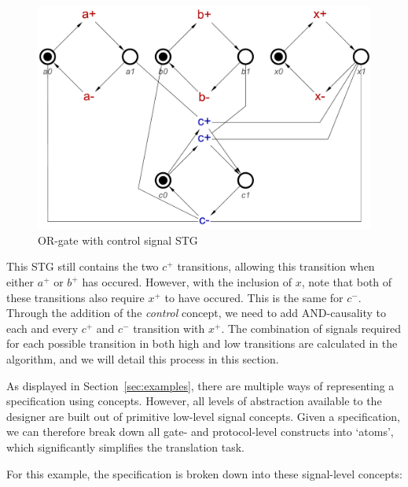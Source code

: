 \documentclass[british,conference,compsoc]{IEEEtran}
\begin{document}
\begin{figure}[h]
\begin{centering}
\includegraphics[scale=0.25]{Images/or-gate-ctrl-stg}
\par\end{centering}
\protect\caption{\label{fig:or-gate-ctrl} OR-gate with control signal STG}
\end{figure}

This STG still contains the two $c^{+}$ transitions, allowing this transition when either 
$a^{+}$ or $b^{+}$ has occured. However, with the inclusion of $x$, note that both
of these transitions also require $x^{+}$ to have occured. This is the same for $c^{-}$. 
Through the addition of the \emph{control} concept, we need to add AND-causality to
each and every $c^{+}$ and $c^{-}$ transition with $x^{+}$. The combination of signals
required for each possible transition in both high and low transitions are calculated in the
algorithm, and we will detail this process in this section.

As displayed in Section~\ref{sec:examples}, there are multiple ways of
representing a specification using concepts. However, all levels of
abstraction available to the designer are built out of primitive low-level
signal concepts. Given a specification, we can therefore
break down all gate- and protocol-level constructs into `atoms', which
significantly simplifies the translation task.

For this example, the specification is broken down into these signal-level concepts:
\end{document}
